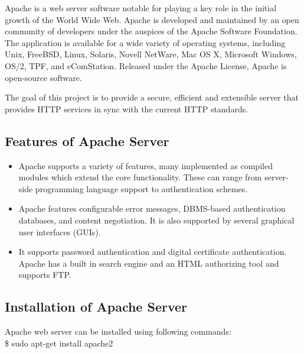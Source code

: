 \begin{figure}[h]
\end{figure}
\noindent Apache is a web server software notable for playing a key role in the initial 
growth of the World Wide Web. Apache is developed and maintained by an 
open community of developers under the auspices of the Apache Software 
Foundation. The application is available for a wide variety of operating 
systems, including Unix, FreeBSD, Linux, Solaris, Novell NetWare, Mac OS X, 
Microsoft Windows, OS/2, TPF, and eComStation. Released under the Apache 
License, Apache is open-source software.

The goal of this project is to provide a secure, efficient and extensible 
server that provides HTTP services in sync with the current HTTP standards.
\subsection{Features of Apache Server}
\begin{itemize}
\item Apache supports a variety of features, many implemented as compiled 
modules which extend the core functionality. These can range from 
server-side programming language support to authentication schemes. 
\item Apache features configurable error messages, DBMS-based 
authentication databases, and content negotiation. It is also supported 
by several graphical user interfaces (GUIs).
\item It supports password authentication and digital certificate 
authentication. Apache has a built in search engine and an HTML authorizing 
tool and supports FTP.
\end{itemize}

\subsection{Installation of Apache Server}
Apache web server can be installed using following commands:\\

\hspace{4pt} \$ sudo apt-get install apache2
\newpage
